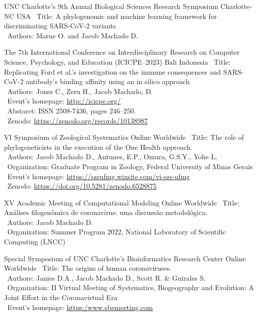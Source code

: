 \documentclass[11pt, letterpaper, sans]{moderncv}
\begin{document}
\cventry{---}
	{UNC Charlotte’s 9th Annual Biological Sciences Research Symposium}
	{Charlotte-NC}
	{USA}
	{}
	{
		\textbullet~Title: A phylogenomic and machine learning framework for discriminating SARS-CoV-2 variants\\
		\textbullet~Authors: Marne O. and Jacob Machado D.\\
	}

\cventry{---}
	{The 7th International Conference on Interdisciplinary Research on Computer Science, Psychology, and Education (ICICPE--2023)}
	{Bali}
	{Indonesia}
	{}
	{
		\textbullet~Title: Replicating Ford et al.’s investigation on the immune consequences and SARS-CoV-2 antibody’s binding affinity using an in silico approach\\
		\textbullet~Authors: Jones C., Zeru H., Jacob Machado, D.\\
		\textbullet~Event's homepage: \url{http://icicpe.org/}\\
		\textbullet~Abstarct: ISSN 2508-7436, pages 246--250.\\
		\textbullet~Zenodo: \url{https://zenodo.org/records/10138987}
	}

	{VI Symposium of Zoological Systematics}
	{Online}
	{Worldwide}
	{}
	{
		\textbullet~Title: The role of phylogeneticists in the execution of the One Health approach.\\
		\textbullet~Authors: Jacob Machado D., Antunes, E.P., Omura, G.S.Y., Yohe L.\\
		\textbullet~Organization: Graduate Program in Zoology, Federal University of Minas Gerais\\
		\textbullet~Event's homepage: \url{https://szsufmg.wixsite.com/vi-szs-ufmg}\\
		\textbullet~Zenodo: \url{https://doi.org/10.5281/zenodo.6528875}
	}

\cventry{---}
	{XV Academic Meeting of Computational Modeling}
	{Online}
	{Worldwide}
	{}
	{
		\textbullet~Title: Análises filogenômica de coronavírus: uma discussão metodológica.\\
		\textbullet~Authors: Jacob Machado D.\\
		\textbullet~Organization: Summer Program 2022, National Laboratory of Scientific Computing (LNCC)\\
	}

	{Special Symposium of UNC Charlotte's Bioinformatics Research Center}
	{Online}
	{Worldwide}
	{}
	{
		\textbullet~Title: The origins of human coronaviruses.\\
		\textbullet~Authors: Janies D.A., Jacob Machado D., Scott R. \& Guirales S.\\
		\textbullet~Organization: II Virtual Meeting of Systematics, Biogeography and Evolution: A Joint Effort in the Coronavirtual Era\\
		\textbullet~Event's homepage: \url{https:/www.sbemeeting.com}
	}
\end{document}
